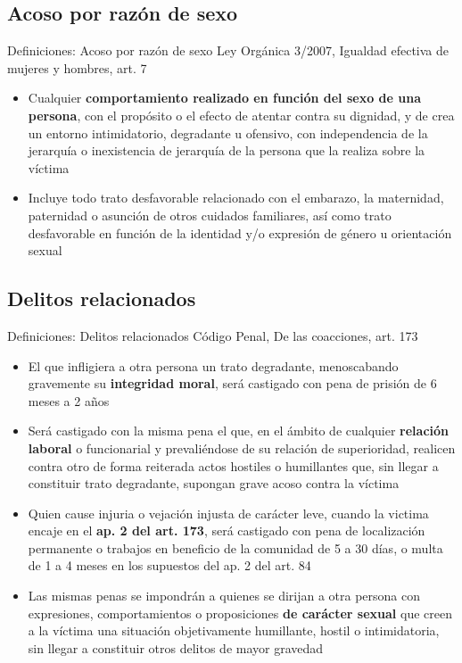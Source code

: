 \documentclass{beamer}
\begin{document}
    \subsection{Acoso por razón de sexo}
    \begin{frame}{Definiciones: Acoso por razón de sexo}
        Ley Orgánica 3/2007, Igualdad efectiva de mujeres y hombres, art. 7
        \begin{itemize}
            \item Cualquier \textbf{comportamiento realizado en función del sexo de una persona}, con el propósito o el efecto de
            atentar contra su dignidad, y de crea un entorno intimidatorio, degradante u ofensivo, con independencia de
            la jerarquía o inexistencia de jerarquía de la persona que la realiza sobre la víctima
            \item Incluye todo trato desfavorable relacionado con el embarazo, la maternidad, paternidad o asunción de
            otros cuidados familiares, así como trato desfavorable en función de la identidad y/o expresión de género u
            orientación sexual
        \end{itemize}
    \end{frame}

    \subsection{Delitos relacionados}
    \begin{frame}{Definiciones: Delitos relacionados}
        Código Penal, De las coacciones, art. 173
        \small
        \begin{itemize}
            \item El que infligiera a otra persona un trato degradante, menoscabando gravemente su \textbf{integridad moral}, será castigado con
            pena de prisión de 6 meses a 2 años
            \item Será castigado con la misma pena el que, en el ámbito de cualquier \textbf{relación laboral} o funcionarial y prevaliéndose de
            su relación de superioridad, realicen contra otro de forma reiterada actos hostiles o humillantes que, sin llegar a constituir
            trato degradante, supongan grave acoso contra la víctima
            \item Quien cause injuria o vejación injusta de carácter leve, cuando la victima encaje en el \textbf{ap. 2 del art. 173},
            será castigado con pena de localización permanente o trabajos en beneficio de la comunidad de 5 a 30 días,
            o multa de 1 a 4 meses en los supuestos del ap. 2 del art. 84
            \item Las mismas penas se impondrán a quienes se dirijan a otra persona con expresiones, comportamientos o proposiciones
            \textbf{de carácter sexual} que creen a la víctima una situación objetivamente humillante, hostil o intimidatoria, sin llegar a
            constituir otros delitos de mayor gravedad
        \end{itemize}
    \end{frame}
\end{document}
